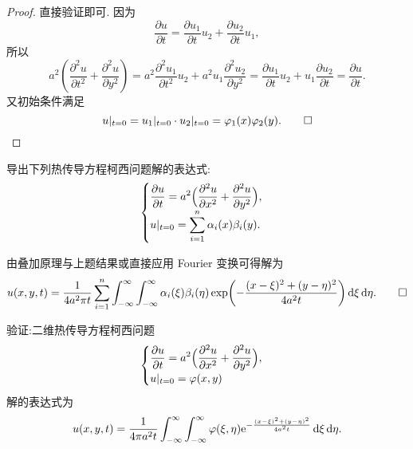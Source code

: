 \begin{proof}
  直接验证即可. 因为
  	$$\frac{\partial u}{\partial t}=\frac{\partial u_1}{\partial t}u_2+\frac{\partial u_2}{\partial t}u_1,$$
  	所以
  	$$a^{2}\left(\frac{\partial^{2}u}{\partial t^{2}}+\frac{\partial^{2}u}{\partial y^{2}}\right)=a^{2}\frac{\partial^{2}u_{1}}{\partial t^{2}}u_{2}+a^{2}u_{1}\frac{\partial^{2}u_{2}}{\partial y^{2}}=\frac{\partial u_{1}}{\partial t}u_{2}+u_{1}\frac{\partial u_{2}}{\partial t}=\frac{\partial u}{\partial t}.$$
  	又初始条件满足
  	\[u|_{t=0}=u_{1}|_{t=0}\cdot u_{2}|_{t=0}=\varphi_{1}(x)\varphi_{2}(y).\qedhere\]
\end{proof}


\begin{exercise}[8]
  导出下列热传导方程柯西问题解的表达式:
  \[\begin{cases}
    \displaystyle\frac{\partial u}{\partial t} 
      = a^2\Bigl(\frac{\partial^2u}{\partial x^2} +
                  \frac{\partial^2u}{\partial y^2}\Bigr), \\
   \displaystyle u|_{t=0} = \sum_{i=1}^n \alpha_i(x)\beta_i(y).
  \end{cases}\]
\end{exercise}

\begin{solution}
  由叠加原理与上题结果或直接应用 Fourier 变换可得解为
  \[u(x,y,t) = \frac{1}{4a^2\pi t} \sum_{i=1}^n \int_{-\infty}^{\infty}
    \int_{-\infty}^{\infty} \alpha_i(\xi) \beta_i(\eta)
      \exp\biggl(-\frac{(x-\xi)^2+(y-\eta)^2}{4a^2 t}\biggr) \mathop{}\!\mathrm{d}\xi\mathop{}\!\mathrm{d}\eta.\qedhere\]
\end{solution}


\begin{exercise}[9]
  验证:二维热传导方程柯西问题
  \[\begin{cases}
    \displaystyle\frac{\partial u}{\partial t} = a^2 
      \Bigl(\frac{\partial^2 u}{\partial x^2} + \frac{\partial^2 u}{\partial y^2}\Bigr), \\
    u|_{t=0} = \varphi(x,y)
  \end{cases}\]
  解的表达式为
  \[u(x,y,t) = \frac{1}{4\pi a^2t} \int_{-\infty}^{\infty}
    \int_{-\infty}^{\infty} \varphi(\xi,\eta) \mathrm{e}^{-\frac{(x-\xi)^2+(y-\eta)^2}{4a^2t}}
    \mathop{}\!\mathrm{d}\xi\mathop{}\!\mathrm{d}\eta.\]
\end{exercise}


